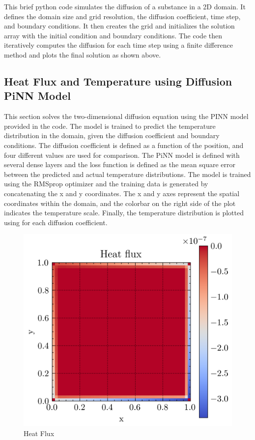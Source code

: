 This brief python code simulates the diffusion of a substance in a 2D domain. It defines the domain size and grid resolution, the diffusion coefficient, time step, and boundary conditions. It then creates the grid and initializes the solution array with the initial condition and boundary conditions. The code then iteratively computes the diffusion for each time step using a finite difference method and plots the final solution as shown above.

\subsection{Heat Flux and Temperature using Diffusion PiNN Model}

This section solves the two-dimensional diffusion equation using the PINN model provided in the code. The model is trained to predict the temperature distribution in the domain, given the diffusion coefficient and boundary conditions. The diffusion coefficient is defined as a function of the position, and four different values are used for comparison. The PiNN model is defined with several dense layers and the loss function is defined as the mean square error between the predicted and actual temperature distributions. The model is trained using the RMSprop optimizer and the training data is generated by concatenating the x and y coordinates. The x and y axes represent the spatial coordinates within the domain, and the colorbar on the right side of the plot indicates the temperature scale. Finally, the temperature distribution is plotted using for each diffusion coefficient. 

\begin{figure}[htb!]
\begin{center}
\includegraphics[width=.49\textwidth]{images/heat_flux.png}
\vspace*{-8mm}
\caption{Heat Flux}
\label{fig:hf}
\end{center}
\end{figure}

